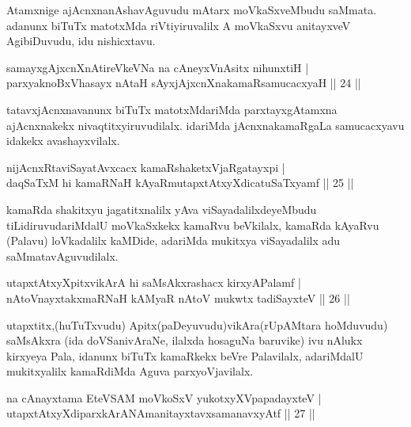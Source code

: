 \begin{artha}
Atamxnige ajAcnxnanAshavAguvudu mAtarx moVkaSxveMbudu saMmata. adanunx biTuTx matotxMda riVtiyiruvalilx A moVkaSxvu anitayxveV AgibiDuvudu, idu nishicxtavu.
\end{artha}

\begin{shl}
samayxgAjxcnXnAtireVkeVNa na cAneyxVnAsitx nihunxtiH |\\
parxyaknoBxVhasayx nAtaH sAyxjAjxcnXnakamaRsamucacxyaH \hfill || 24 ||
\end{shl}

\begin{artha}
tatavxjAcnxnavanunx biTuTx matotxMdariMda parxtayxgAtamxna ajAcnxnakekx nivaqtitxyiruvudilalx. idariMda jAcnxnakamaRgaLa samucacxyavu idakekx avashayxvilalx.
\end{artha}

\begin{shl}
nijAcnxRtaviSayatAvxcacx kamaRshaketxVjaRgatayxpi |\\
daqSaTxM hi kamaRNaH kAyaRmutapxtAtxyXdicatuSaTxyamf \hfill || 25 ||
\end{shl}

\begin{artha}
kamaRda shakitxyu jagatitxnalilx yAva viSayadalilxdeyeMbudu tiLidiruvudariMdalU moVkaSxkekx kamaRvu beVkilalx, kamaRda kAyaRvu (Palavu) loVkadalilx kaMDide, adariMda mukitxya viSayadalilx adu saMmatavAguvudilalx.
\end{artha}


\begin{shl}
utapxtAtxyXpitxvikArA hi saMsAkxrashacx kirxyAPalamf |\\
nAtoV\s nayxtakxmaRNaH kAMyaR nAtoV mukwtx tadiSayxteV \hfill || 26 ||
\end{shl}

\begin{artha}
utapxtitx,(huTuTxvudu) Apitx(paDeyuvudu)vikAra(rUpAMtara hoMduvudu) saMsAkxra (ida doVSanivAraNe, ilalxda hosaguNa baruvike) ivu nAlukx kirxyeya Pala, idanunx biTuTx kamaRkekx beVre Palavilalx, adariMdalU mukitxyalilx kamaRdiMda Aguva parxyoVjavilalx.
\end{artha}

\begin{shl}
na cAnayxtama EteVSAM moVkoSxV yukotxyXVpapadayxteV |\\
utapxtAtxyXdiparxkArANAmanitayxtavxsamanavxyAtf \hfill ||  27 ||
\end{shl}

